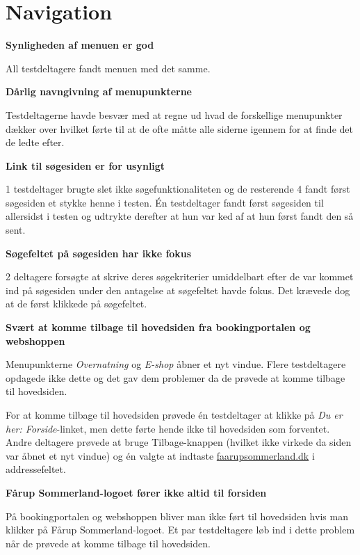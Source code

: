 \documentclass[10pt,a4paper]{article}      %
\newcommand\pic[1]{\texttt{[image: Pics/\#1]}}
\renewcommand\good{\pic{good}}
\renewcommand\smallproblem{\pic{smallproblem}}
\renewcommand\seriousproblem{\pic{seriousproblem}}
\begin{document}
\section{Navigation}
\begin{kommentarer}

\item[\good]{\textbf{Synligheden af menuen er god}}

All testdeltagere fandt menuen med det samme.

\item[\seriousproblem]{\textbf{Dårlig navngivning af menupunkterne}}

Testdeltagerne havde besvær med at regne ud hvad de forskellige
menupunkter dækker over hvilket førte til at de ofte måtte alle siderne igennem for at finde
det de ledte efter.

\item[\smallproblem]{\textbf{Link til søgesiden er for usynligt}}

1 testdeltager brugte slet ikke søgefunktionaliteten og de resterende 4 fandt først søgesiden
et stykke henne i testen. Én testdeltager fandt først søgesiden til allersidst i testen og
udtrykte derefter at hun var ked af at hun først fandt den så sent.

\item[\smallproblem]{\textbf{Søgefeltet på søgesiden har ikke fokus}}

2 deltagere forsøgte at skrive deres søgekriterier umiddelbart efter de var kommet ind på
søgesiden under den antagelse at søgefeltet havde fokus. Det krævede dog at de først klikkede
på søgefeltet.

\item[\smallproblem]{\textbf{Svært at komme tilbage til hovedsiden fra bookingportalen og webshoppen}}

Menupunkterne \emph{Overnatning} og \emph{E-shop} åbner et nyt vindue. Flere testdeltagere
opdagede ikke dette og det gav dem problemer da de prøvede at komme tilbage til hovedsiden.

For at komme tilbage til hovedsiden prøvede én testdeltager at klikke på \emph{Du er her:
Forside}-linket, men dette førte hende ikke til hovedsiden som forventet. Andre deltagere
prøvede at bruge Tilbage-knappen (hvilket ikke virkede da siden var åbnet et nyt vindue)
og én valgte at indtaste \url{faarupsommerland.dk} i addressefeltet.

\item[\smallproblem]{\textbf{Fårup Sommerland-logoet fører ikke altid til forsiden}}

På bookingportalen og webshoppen bliver man ikke ført til hovedsiden hvis man klikker på Fårup
Sommerland-logoet. Et par testdeltagere løb ind i dette problem når de prøvede at komme
tilbage til hovedsiden.

\end{kommentarer}
\end{document}
